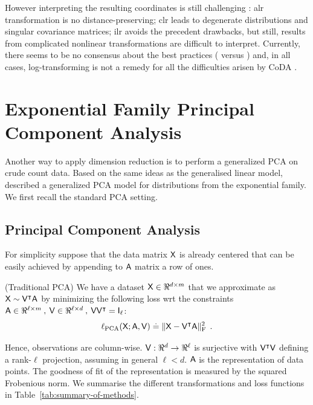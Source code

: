 \documentclass{article}
\begin{document}
However interpreting the resulting coordinates is still challenging \cite{epmbIL, mpetTS}:
alr transformation is no distance-preserving;
clr leads to degenerate distributions and singular covariance matrices;
ilr avoids the precedent drawbacks,
but still, results from complicated nonlinear transformations are difficult to interpret.
Currently, there seems to be no consensus about the best practices (\cite{gCDAP} versus \cite{petLNCDA}) and, in all cases, log-transforming is not a remedy for all the difficulties arisen by CoDA \cite{lmtzhCCC}.

\section{Exponential Family Principal Component Analysis}

Another way to apply dimension reduction is to perform a generalized PCA on crude count data.
Based on the same ideas as the generalised linear model, \cite{cdsAG} described a
generalized PCA model for distributions from the exponential family.
We first recall the standard PCA setting.

\subsection{Principal Component Analysis}

For simplicity suppose that the data matrix $\mathsf{X}$ is already centered
that can be easily achieved by appending to $\mathsf{A}$ matrix a row of ones.
\begin{mdframed}[style=MyFrame]
(Traditional PCA) We have a dataset $\mathsf{X} \in \Re^{d \times m}$ that we approximate as
$\mathsf{X} \sim \mathsf{V}^\intercal \mathsf{A}$ by minimizing the following loss wrt the constraints
$\mathsf{A} \in \Re^{\ell \times m}\:,\:\mathsf{V} \in \Re^{\ell \times d}\:,\:\mathsf{V} \mathsf{V}^\intercal = \mathsf{I}_\ell$:
\begin{equation}
\ell_{\mathrm{PCA}}(\mathsf{X}; \mathsf{A},\mathsf{V}) \stackrel{\mathrm{.}}{=} \|\mathsf{X} - \mathsf{V}^\intercal \mathsf{A}\|_\mathrm{F}^2\:\:.\label{defSQL}
\end{equation}
\end{mdframed}
Hence, observations are column-wise. $\mathsf{V} : \Re^d \rightarrow
\Re^\ell$ is surjective with $\mathsf{V}^\intercal \mathsf{V}$ defining a rank-$\ell$
projection, assuming in general $\ell < d$. $\mathsf{A}$ is the representation
of data points. The goodness of fit of the
representation is measured by the squared Frobenious norm.
We summarise the different transformations and loss functions in
Table~\ref{tab:summary-of-methods}.
\end{document}
